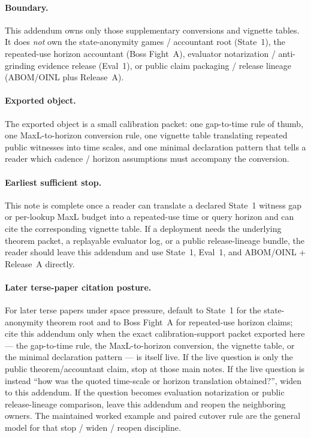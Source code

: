 \documentclass[11pt]{article}
\theoremstyle{definition}
\theoremstyle{remark}
\begin{document}
\paragraph{Boundary.}
This addendum owns only those supplementary conversions and vignette tables.
It does \emph{not} own the state-anonymity games / accountant root (State~1), the repeated-use horizon accountant (Boss Fight~A), evaluator notarization / anti-grinding evidence release (Eval~1), or public claim packaging / release lineage (ABOM/OINL plus Release~A).\cite{series:state1,series:bossfightA,series:evalnotary,series:abomoinl,series:releaseproperty}

\paragraph{Exported object.}
The exported object is a small calibration packet: one gap-to-time rule of thumb, one MaxL-to-horizon conversion rule, one vignette table translating repeated public witnesses into time scales, and one minimal declaration pattern that tells a reader which cadence / horizon assumptions must accompany the conversion.

\paragraph{Earliest sufficient stop.}
This note is complete once a reader can translate a declared State~1 witness gap or per-lookup MaxL budget into a repeated-use time or query horizon and can cite the corresponding vignette table.
If a deployment needs the underlying theorem packet, a replayable evaluator log, or a public release-lineage bundle, the reader should leave this addendum and use State~1, Eval~1, and ABOM/OINL + Release~A directly.\cite{series:state1,series:evalnotary,series:abomoinl,series:releaseproperty}

\paragraph{Later terse-paper citation posture.}
For later terse papers under space pressure, default to State~1 for the state-anonymity theorem root and to Boss Fight~A for repeated-use horizon claims; cite this addendum only when the exact calibration-support packet exported here --- the gap-to-time rule, the MaxL-to-horizon conversion, the vignette table, or the minimal declaration pattern --- is itself live.
If the live question is only the public theorem/accountant claim, stop at those main notes.
If the live question is instead ``how was the quoted time-scale or horizon translation obtained?'', widen to this addendum.
If the question becomes evaluation notarization or public release-lineage comparison, leave this addendum and reopen the neighboring owners.
The maintained worked example and paired cutover rule are the general model for that stop / widen / reopen discipline.\cite{series:workedexample,series:pairedterminalcutoverrules}
\end{document}
